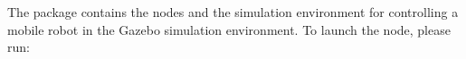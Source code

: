 The package contains the nodes and the simulation environment for controlling a mobile robot in the Gazebo simulation environment. To launch the node, please run\+: 
\begin{DoxyCode}{0}
\end{DoxyCode}
 